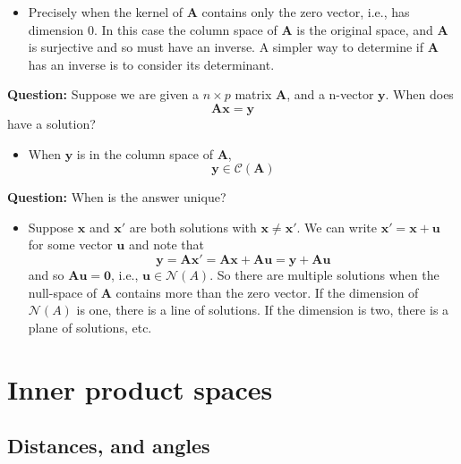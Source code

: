 \documentclass[]{book}
\providecommand{\tightlist}{%
  \setlength{\itemsep}{0pt}\setlength{\parskip}{0pt}}
\theoremstyle{definition}
\theoremstyle{definition}
\theoremstyle{definition}
\theoremstyle{remark}
\begin{document}
\begin{itemize}
\tightlist
\item
  Precisely when the kernel of \(\boldsymbol A\) contains only the zero vector, i.e., has dimension 0. In this case the column space of \(\boldsymbol A\) is the original space, and \(\boldsymbol A\) is surjective and so must have an inverse. A simpler way to determine if \(\boldsymbol A\) has an inverse is to consider its determinant.
\end{itemize}

\textbf{Question:} Suppose we are given a \(n\times p\) matrix \(\boldsymbol A\), and a n-vector \(\boldsymbol y\). When does
\[\boldsymbol A\boldsymbol x= \boldsymbol y\]
have a solution?

\begin{itemize}
\tightlist
\item
  When \(\boldsymbol y\) is in the column space of \(\boldsymbol A\),
  \[\boldsymbol y\in \mathcal{C}(\boldsymbol A)\]
\end{itemize}

\textbf{Question:} When is the answer unique?

\begin{itemize}
\tightlist
\item
  Suppose \(\boldsymbol x\) and \(\boldsymbol x'\) are both solutions with \(\boldsymbol x\not =\boldsymbol x'\). We can write \(\boldsymbol x'=\boldsymbol x+\boldsymbol u\) for some vector \(\boldsymbol u\) and note that
  \[\boldsymbol y=\boldsymbol A\boldsymbol x' = \boldsymbol A\boldsymbol x+\boldsymbol A\boldsymbol u= \boldsymbol y+\boldsymbol A\boldsymbol u\]
  and so \(\boldsymbol A\boldsymbol u=\boldsymbol 0\), i.e., \(\boldsymbol u\in \mathcal{N}(A)\). So there are multiple solutions when the null-space of \(\boldsymbol A\) contains more than the zero vector. If the dimension of \(\mathcal{N}(A)\) is one, there is a line of solutions. If the dimension is two, there is a plane of solutions, etc.
\end{itemize}

\hypertarget{linalg-innerprod}{%
\section{Inner product spaces}\label{linalg-innerprod}}

\hypertarget{normed}{%
\subsection{Distances, and angles}\label{normed}}
\end{document}
